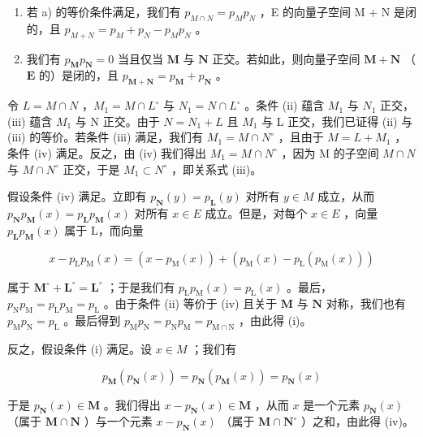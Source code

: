 \begin{enumerate}
\def\labelenumi{\alph{enumi})}
\setcounter{enumi}{1}
\item
  若 a) 的等价条件满足，我们有 \(p_{M \cap N} = p_{M} p_{N}\) ，E 的向量子空间 M + N 是闭的，且 \(p_{M + N} = p_{M} + p_{N} - p_{M} p_{N}\) 。
\item
  我们有 \(p_{\mathbf{M}}p_{\mathbf{N}} = 0\) 当且仅当 \(\mathbf{M}\) 与 \(\mathbf{N}\) 正交。若如此，则向量子空间 \(\mathbf{M} + \mathbf{N}\) （\(\mathbf{E}\) 的）是闭的，且 \(p_{\mathbf{M} + \mathbf{N}} = p_{\mathbf{M}} + p_{\mathbf{N}}\) 。
\end{enumerate}

令 \(L = M \cap N\) ，\(M_{1} = M \cap L^{\circ}\) 与 \(N_{1} = N \cap L^{\circ}\) 。条件 (ii) 蕴含 \(M_{1}\) 与 \(N_{1}\) 正交，(iii) 蕴含 \(M_{1}\) 与 N 正交。由于 \(N = N_{1} + L\) 且 \(M_{1}\) 与 L 正交，我们已证得 (ii) 与 (iii) 的等价。若条件 (iii) 满足，我们有 \(M_{1} = M \cap N^{\circ}\) ，且由于 \(M = L + M_{1}\) ，条件 (iv) 满足。反之，由 (iv) 我们得出 \(M_{1} = M \cap N^{\circ}\) ，因为 M 的子空间 \(M \cap N\) 与 \(M \cap N^{\circ}\) 正交，于是 \(M_{1} \subset N^{\circ}\) ，即关系式 (iii)。

假设条件 (iv) 满足。立即有 \(p_{\mathbf{N}}(y) = p_{\mathbf{L}}(y)\) 对所有 \(y \in M\) 成立，从而 \(p_{\mathbf{N}}p_{\mathbf{M}}(x) = p_{\mathbf{L}}p_{\mathbf{M}}(x)\) 对所有 \(x \in E\) 成立。但是，对每个 \(x \in E\) ，向量 \(p_{\mathbf{L}}p_{\mathbf{M}}(x)\) 属于 L，而向量

\[
x - p _ {\mathrm{L}} p _ {\mathrm{M}} (x) = \left(x - p _ {\mathrm{M}} (x)\right) + \left(p _ {\mathrm{M}} (x) - p _ {\mathrm{L}} \left(p _ {\mathrm{M}} (x)\right)\right)
\]

属于 \(\mathbf{M}^{\circ} + \mathbf{L}^{\circ} = \mathbf{L}^{\circ}\) ；于是我们有 \(p_{\mathrm{L}}p_{\mathrm{M}}(x) = p_{\mathrm{L}}(x)\) 。最后，\(p_{\mathrm{N}}p_{\mathrm{M}} = p_{\mathrm{L}}p_{\mathrm{M}} = p_{\mathrm{L}}\) 。由于条件 (ii) 等价于 (iv) 且关于 \(\mathbf{M}\) 与 \(\mathbf{N}\) 对称，我们也有 \(p_{\mathrm{M}}p_{\mathrm{N}} = p_{\mathrm{L}}\) 。最后得到 \(p_{\mathrm{M}}p_{\mathrm{N}} = p_{\mathrm{N}}p_{\mathrm{M}} = p_{\mathrm{M}\cap \mathrm{N}}\) ，由此得 (i)。

反之，假设条件 (i) 满足。设 \(x \in M\) ；我们有

\[
p _ {\mathbf {M}} (p _ {\mathbf {N}} (x)) = p _ {\mathbf {N}} (p _ {\mathbf {M}} (x)) = p _ {\mathbf {N}} (x)
\]

于是 \(p_{\mathbf{N}}(x) \in \mathbf{M}\) 。我们得出 \(x - p_{\mathbf{N}}(x) \in \mathbf{M}\) ，从而 \(x\) 是一个元素 \(p_{\mathbf{N}}(x)\) （属于 \(\mathbf{M} \cap \mathbf{N}\) ）与一个元素 \(x - p_{\mathbf{N}}(x)\) （属于 \(\mathbf{M} \cap \mathbf{N}^{\circ}\) ）之和，由此得 (iv)。

